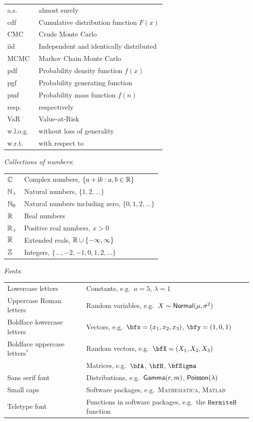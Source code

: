 \begin{tabular}{ll}
a.s. & almost surely \\
cdf & Cumulative distribution function $F(x)$ \\
CMC & Crude Monte Carlo \\
iid & Independent and identically distributed  \\
MCMC & Markov Chain Monte Carlo \\
pdf & Probability density function  $f(x)$ \\
pgf & Probability generating function \\
pmf & Probability mass function $f(n)$ \\
resp. & respectively \\
VaR & Value-at-Risk \\
w.l.o.g.\ & without loss of generality \\
w.r.t.\ & with respect to
\end{tabular}


\emph{Collections of numbers}:

\begin{tabular}{ll}
$\mathbb{C}$ & Complex numbers, $\{ a + \mathrm{i} b : a,b \in \mathbb{R} \}$ \\
$\mathbb{N}_+$ & Natural numbers, $\{1, 2, \dots\}$ \\
$\mathbb{N}_0$ & Natural numbers including zero, $\{0, 1, 2, \dots\}$ \\
$\mathbb{R}$ & Real numbers \\
$\mathbb{R}_+$ & Positive real numbers, $x > 0$ \\
$\overline{\mathbb{R}}$ & Extended reals, $\mathbb{R} \cup \{-\infty, \infty\}$ \\
$\mathbb{Z}$ & Integers, $\{ \dots, -2, -1, 0, 1, 2, \dots \}$
\end{tabular}

\emph{Fonts}:

\begin{tabular}{ll}
Lowercase letters & Constants, e.g.\ $a = 5$, $\lambda = 1$ \\
Uppercase Roman letters & Random variables, e.g.\ $X \sim \mathsf{Normal}(\mu, \sigma^2)$ \\
Boldface lowercase letters & Vectors, e.g.\ $\bfx = (x_1, x_2, x_3)$, $\bfy = (1, 0, 1)$ \\
Boldface uppercase letters${}^*$ & Random vectors, e.g.\ $\bfX = (X_1, X_2, X_3)$ \\
                           & Matrices, e.g.\ $\bfA$, $\bfH$, $\bfSigma$ \\
Sans serif font & Distributions, e.g.\ $\mathsf{Gamma}(r,m)$, $\mathsf{Poisson}(\lambda)$ \\
Small caps & Software packages, e.g.\ \textsc{Mathematica}, \textsc{Matlab} \\
Teletype font & Functions in software packages, e.g.\ the $\texttt{HermiteH}$ function \\
\end{tabular}

